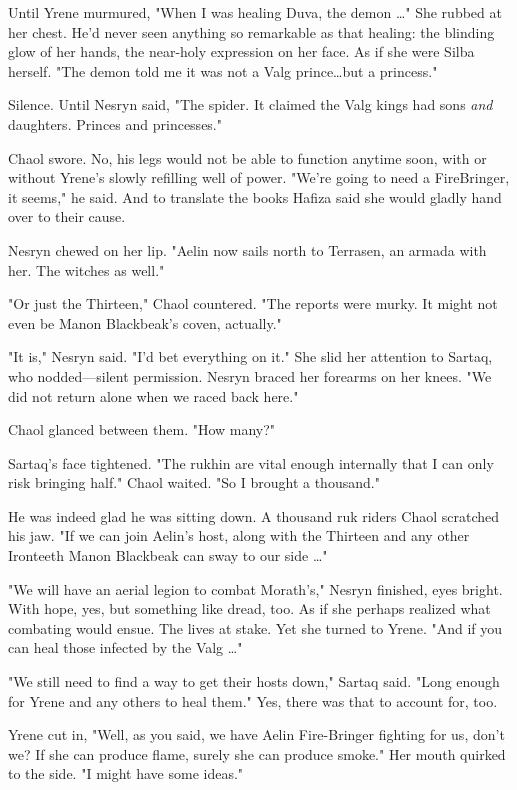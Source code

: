 Until Yrene murmured, "When I was healing Duva, the demon \ldots" She rubbed at her chest.
He'd never seen anything so remarkable as that healing: the blinding glow of her hands, the near-holy expression on her face.
As if she were Silba herself.
"The demon told me it was not a Valg prince\ldots but a princess."

Silence.
Until Nesryn said, "The spider.
It claimed the Valg kings had sons \emph{and} daughters.
Princes and princesses."

Chaol swore.
No, his legs would not be able to function anytime soon, with or without Yrene's slowly refilling well of power.
"We're going to need a FireBringer, it seems," he said.
And to translate the books Hafiza said she would gladly hand over to their cause.

Nesryn chewed on her lip.
"Aelin now sails north to Terrasen, an armada with her.
The witches as well."

"Or just the Thirteen," Chaol countered.
"The reports were murky.
It might not even be Manon Blackbeak's coven, actually."

"It is," Nesryn said.
"I'd bet everything on it."
She slid her attention to Sartaq, who nodded---silent permission.
Nesryn braced her forearms on her knees.
"We did not return alone when we raced back here."

Chaol glanced between them.
"How many?"

Sartaq's face tightened.
"The rukhin are vital enough internally that I can only risk bringing half."
Chaol waited.
"So I brought a thousand."

He was indeed glad he was sitting down.
A thousand ruk riders 
Chaol scratched his jaw.
"If we can join Aelin's host, along with the Thirteen and any other Ironteeth Manon Blackbeak can sway to our side \ldots"

"We will have an aerial legion to combat Morath's," Nesryn finished, eyes bright.
With hope, yes, but something like dread, too.
As if she perhaps realized what combating would ensue.
The lives at stake.
Yet she turned to Yrene.
"And if you can heal those infected by the Valg \ldots"

"We still need to find a way to get their hosts down," Sartaq said.
"Long enough for Yrene and any others to heal them."
Yes, there was that to account for, too.

Yrene cut in, "Well, as you said, we have Aelin Fire-Bringer fighting for us, don't we?
If she can produce flame, surely she can produce smoke."
Her mouth quirked to the side.
"I might have some ideas."

